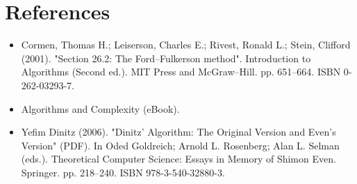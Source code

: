 \documentclass{article}
\begin{document}
    \section{References}
    \begin{itemize}
        \item Cormen, Thomas H.; Leiserson, Charles E.; Rivest, Ronald L.; Stein, Clifford (2001). "Section 26.2: The Ford–Fulkerson method". Introduction to Algorithms (Second ed.). MIT Press and McGraw–Hill. pp. 651–664. ISBN 0-262-03293-7.
        \item Algorithms and Complexity (eBook).
        \item Yefim Dinitz (2006). "Dinitz' Algorithm: The Original Version and Even's Version" (PDF). In Oded Goldreich; Arnold L. Rosenberg; Alan L. Selman (eds.). Theoretical Computer Science: Essays in Memory of Shimon Even. Springer. pp. 218–240. ISBN 978-3-540-32880-3.
    \end{itemize}
\end{document}
